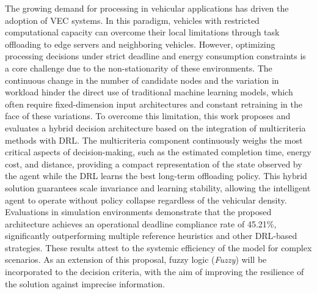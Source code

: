 The growing demand for processing in vehicular applications has driven the adoption of \gls{VEC} systems. In this paradigm, vehicles with restricted computational capacity can overcome their local limitations through task offloading to edge servers and neighboring vehicles. However, optimizing processing decisions under strict deadline and energy consumption constraints is a core challenge due to the non-stationarity of these environments. The continuous change in the number of candidate nodes and the variation in workload hinder the direct use of traditional machine learning models, which often require fixed-dimension input architectures and constant retraining in the face of these variations. To overcome this limitation, this work proposes and evaluates a hybrid decision architecture based on the integration of multicriteria methods with \gls{DRL}. The multicriteria component continuously weighs the most critical aspects of decision-making, such as the estimated completion time, energy cost, and distance, providing a compact representation of the state observed by the agent while the \gls{DRL} learns the best long-term offloading policy. This hybrid solution guarantees scale invariance and learning stability, allowing the intelligent agent to operate without policy collapse regardless of the vehicular density. Evaluations in simulation environments demonstrate that the proposed architecture achieves an operational deadline compliance rate of 45.21\%, significantly outperforming multiple reference heuristics and other \gls{DRL}-based strategies. These results attest to the systemic efficiency of the model for complex scenarios. As an extension of this proposal, fuzzy logic (\textit{Fuzzy}) will be incorporated to the decision criteria, with the aim of improving the resilience of the solution against imprecise information.

